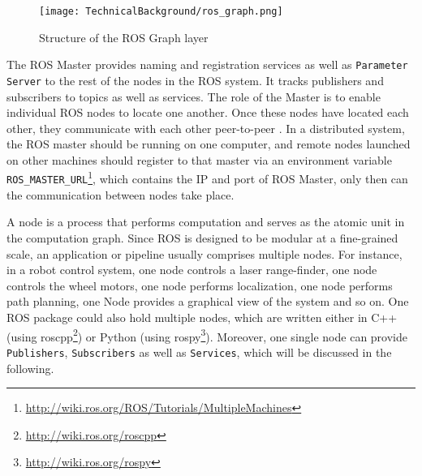 \begin{figure}[h!]
  \centering
  \texttt{[image: TechnicalBackground/ros\_graph.png]}
  \caption{Structure of the ROS Graph layer}
  \label{fig:ros_graph}
\end{figure}

\begin{description}[leftmargin=0in, labelindent=0pt]
\item[Master] {The ROS Master provides naming and registration services as well as \texttt{Parameter Server} to the rest of the nodes in the ROS system. It tracks publishers and subscribers to topics as well as services. The role of the Master is to enable individual ROS nodes to locate one another. Once these nodes have located each other, they communicate with each other peer-to-peer \cite{rosmaster}. In a distributed system, the ROS master should be running on one computer, and remote nodes launched on other machines should register to that master via an environment variable \texttt{ROS\_MASTER\_URL}\footnote{\url{http://wiki.ros.org/ROS/Tutorials/MultipleMachines}}, which contains the IP and port of ROS Master, only then can the communication between nodes take place. 
}

\item[Nodes] {A node is a process that performs computation and serves as the atomic unit in the computation graph. Since ROS is designed to be modular at a fine-grained scale, an application or pipeline usually comprises multiple nodes. For instance, in a robot control system, one node controls a laser range-finder, one node controls the wheel motors, one node performs localization, one node performs path planning, one Node provides a graphical view of the system and so on. One ROS package could also hold multiple nodes, which are written either in C++ (using roscpp\footnote{\url{http://wiki.ros.org/roscpp}}) or Python (using rospy\footnote{\url{http://wiki.ros.org/rospy}}). Moreover, one single node can provide \texttt{Publishers}, \texttt{Subscribers} as well as \texttt{Services}, which will be discussed in the following. 

}
\end{description}
